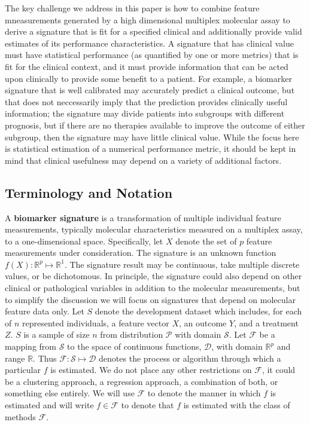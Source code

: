 \documentclass[11pt,]{article}
\begin{document}
The key challenge we address in this paper is how to combine feature
mneasurements generated by a high dimensional multiplex molecular assay
to derive a signature that is fit for a specified clinical and
additionally provide valid estimates of its performance characteristics.
A signature that has clinical value must have statistical performance
(as quantified by one or more metrics) that is fit for the clinical
context, and it must provide information that can be acted upon
clinically to provide some benefit to a patient. For example, a
biomarker signature that is well calibrated may accurately predict a
clinical outcome, but that does not neccessarily imply that the
prediction provides clinically useful information; the signature may
divide patients into subgroups with different prognosis, but if there
are no therapies available to improve the outcome of either subgroup,
then the signature may have little clinical value. While the focus here
is statistical estimation of a numerical performance metric, it should
be kept in mind that clinical usefulness may depend on a variety of
additional factors.

\subsection{Terminology and Notation}\label{terminology-and-notation}

A \textbf{biomarker signature} is a transformation of multiple
individual feature measurements, typically molecular characteristics
measured on a multiplex assay, to a one-dimensional space. Specifically,
let \(X\) denote the set of \(p\) feature measurements under
consideration. The signature is an unknown function
\(f(X): \mathbb{R}^p \mapsto \mathbb{R}^1\). The signature result may be
continuous, take multiple discrete values, or be dichotomous. In
principle, the signature could also depend on other clinical or
pathological variables in addition to the molecular measurements, but to
simplify the discussion we will focus on signatures that depend on
molecular feature data only. Let \(S\) denote the development dataset
which includes, for each of \(n\) represented individuals, a feature
vector \(X\), an outcome \(Y\), and a treatment \(Z\). \(S\) is a sample
of size \(n\) from distribution \(\mathcal{P}\) with domain
\(\mathcal{S}\). Let \(\mathcal{F}\) be a mapping from \(\mathcal{S}\)
to the space of continuous functions, \(\mathcal{D}\), with domain
\(\mathbb{R}^p\) and range \(\mathbb{R}\). Thus
\(\mathcal{F}: \mathcal{S} \mapsto \mathcal{D}\) denotes the process or
algorithm through which a particular \(f\) is estimated. We do not place
any other restrictions on \(\mathcal{F}\), it could be a clustering
approach, a regression approach, a combination of both, or something
else entirely. We will use \(\mathcal{F}\) to denote the manner in which
\(f\) is estimated and will write \(f \in \mathcal{F}\) to denote that
\(f\) is estimated with the class of methods \(\mathcal{F}\).
\end{document}
